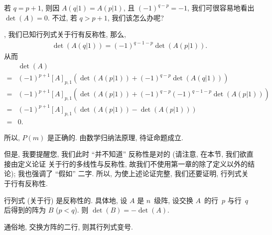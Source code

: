 \documentclass[%
    UTF8,%
    fontset=none,%
    punct=kaiming,%
    zihao=-4,%
    a4paper,%
    oneside,%
]{ctexbook}
\let\emph\relax
\begin{document}
若 \(q = p + 1\),
则因 \(A(q|1) = A(p|1)\),
且 \((-1)^{q-p} = -1\),
我们可很容易地看出
\(\det {(A)} = 0\).
不过, 若 \(q > p + 1\),
我们该怎么办呢?

\emph{假如}, 我们已知行列式关于行有反称性,
那么,
\begin{align*}
    \det {(A(q|1))} = (-1)^{q-1-p} \det {(A(p|1))}.
\end{align*}
从而
\begin{align*}
         & \det {(A)}
    \\
    = {} &
    (-1)^{p+1} [A]_{p,1}
    (\det {(A(p|1))}
    + (-1)^{q-p} \det {(A(q|1))})
    \\
    = {} &
    (-1)^{p+1} [A]_{p,1}
    (\det {(A(p|1))}
    + (-1)^{q-p} (-1)^{q-1-p} \det {(A(p|1))})
    \\
    = {} &
    (-1)^{p+1} [A]_{p,1}
    (\det {(A(p|1))}
    - \det {(A(p|1))})
    \\
    = {} & 0.
\end{align*}

所以, \(P(m)\) 是正确的.
由数学归纳法原理, 待证命题成立.

但是, 我要提醒您, 我们此时 ``并不知道'' 反称性是对的
(请注意, 在本节, 我们欲直接由定义论证%
关于行的多线性与反称性,
故我们不使用第一章的除了定义以外的结论);
我也强调了 ``假如'' 二字.
所以, 为使上述论证完整,
我们还要证明, 行列式关于行有反称性.

\begin{theorem}
    行列式 (关于行) 是反称性的.
    具体地,
    设 \(A\) 是 \(n\)~级阵,
    设交换 \(A\)~的行~\(p\) 与行~\(q\) 后得到的阵为 \(B\)
    (\(p < q\)).
    则 \(\det {(B)} = -\det {(A)}\).

    通俗地, 交换方阵的二行, 则其行列式变号.
\end{theorem}
\end{document}
